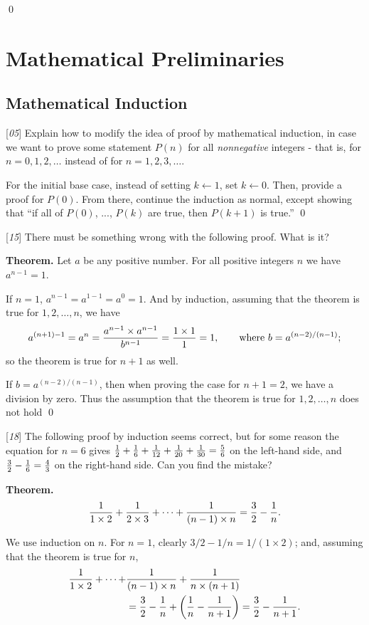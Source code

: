 \sol \qed

\section{Mathematical Preliminaries}
\subsection{Mathematical Induction}

 [\textit{05}] Explain how to modify the idea of proof by mathematical induction, in case we want to prove some statement $P(n)$ for all \textit{nonnegative} integers - that is, for $n = 0, 1, 2, \dots$ instead of for $n = 1, 2, 3, \dots$.

\sol For the initial base case, instead of setting $k \leftarrow 1$, set $k \leftarrow 0$. Then, provide a proof for $P(0)$. From there, continue the induction as normal, except showing that ``if all of $P(0)$, ..., $P(k)$ are true, then $P(k+1)$ is true.'' \qed

 [\textit{15}] There must be something wrong with the following proof. What is it?

{\bf Theorem.} Let $a$ be any positive number. For all positive integers $n$ we have $a^{n-1} = 1$.

\pf If $n = 1$, $a^{n-1} = a^{1-1} = a^{0} = 1$. And by induction, assuming that the theorem is true for $1, 2, \dots, n$, we have $$a^{(n+1) - 1} = a^n = {a^{n-1} \times a^{n-1} \over b^{n-1}} = {1 \times 1 \over 1} = 1, \qquad \text{where } b = a^{(n-2)/(n-1)};$$ so the theorem is true for $n+1$ as well.

\sol If $b = a^{(n-2)/(n-1)}$, then when proving the case for $n + 1 = 2$, we have a division by zero. Thus the assumption that the theorem is true for $1, 2, \dots, n$ does not hold \qed

 [\textit{18}] The following proof by induction seems correct, but for some reason the equation for $n=6$ gives ${1 \over 2} + {1\over 6} + {1\over 12} + {1\over 20} + {1\over 30} = {5\over 6}$ on the left-hand side, and ${3\over 2} - {1\over 6} = {4\over 3}$ on the right-hand side. Can you find the mistake?

{\bf Theorem.} $${1 \over 1\times 2} + {1 \over 2\times 3} + \cdots + {1 \over (n-1)\times n} = {3 \over 2} - {1 \over n}.$$

\pf We use induction on $n$. For $n=1$, clearly $3/2 - 1/n = 1/(1\times 2)$; and, assuming that the theorem is true for $n$,
\begin{align*}
    {1 \over 1\times 2} + \cdots + &{1\over (n-1)\times n} + {1 \over n\times (n+1)} \\
    &={3\over 2} - {1\over n} + \left({1 \over n} - {1 \over n+1}\right) = {3 \over 2} - {1 \over n+1}.
\end{align*}

